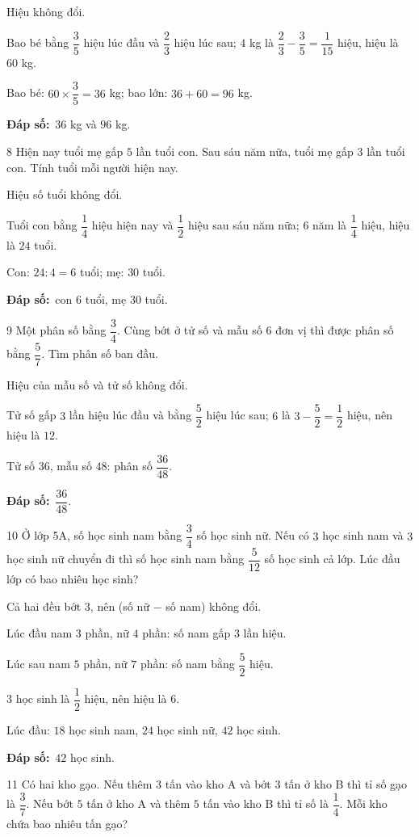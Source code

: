 \documentclass[11pt]{article}
\newif\ifsol \solfalse
\providecommand{\AnsWord}{Đáp số}
\newcommand{\dapso}[1]{\par\textbf{\AnsWord:}\ #1}
\newcommand{\probsol}[1]{%
  \begin{lrbox}{\solmeasure}\begin{minipage}{\dimexpr\linewidth-24pt\relax}#1\end{minipage}\end{lrbox}%
  \ifsol
    \begin{solbox}#1\end{solbox}%
  \else
    \setlength{\solht}{\dimexpr\ht\solmeasure+\dp\solmeasure+0.85cm\relax}%
    \ifdim\solht<1.35cm\setlength{\solht}{1.35cm}\fi
    \begin{tcolorbox}[colback=white,colframe=Line,boxrule=0.8pt,arc=5pt,
      left=8pt,right=8pt,top=4pt,bottom=4pt,height=\solht]{\footnotesize\color{Slate}\itshape\WorkWord}\end{tcolorbox}%
  \fi}
\newcommand{\gap}{\vspace{0.3cm}}
\def\WorkWord{Bài làm:}
\def\AnsWord{Đáp số}
\begin{document}
\probsol{
Hiệu không đổi.\par Bao bé bằng $\dfrac35$ hiệu lúc đầu và $\dfrac23$ hiệu lúc sau; $4$ kg là $\dfrac23-\dfrac35=\dfrac1{15}$ hiệu, hiệu là $60$ kg.\par
Bao bé: $60\times\dfrac35=36$ kg; bao lớn: $36+60=96$ kg.
\dapso{$36$ kg và $96$ kg.}}
\gap
\begin{probbox}{8}{\relax}
Hiện nay tuổi mẹ gấp $5$ lần tuổi con. Sau sáu năm nữa, tuổi mẹ gấp $3$ lần tuổi con. Tính tuổi mỗi người hiện nay.
\end{probbox}
\probsol{
Hiệu số tuổi không đổi.\par Tuổi con bằng $\dfrac14$ hiệu hiện nay và $\dfrac12$ hiệu sau sáu năm nữa; $6$ năm là $\dfrac14$ hiệu, hiệu là $24$ tuổi.\par
Con: $24:4=6$ tuổi; mẹ: $30$ tuổi.
\dapso{con $6$ tuổi, mẹ $30$ tuổi.}}
\gap
\begin{probbox}{9}{\relax}
Một phân số bằng $\dfrac34$. Cùng bớt ở tử số và mẫu số $6$ đơn vị thì được phân số bằng $\dfrac57$. Tìm phân số ban đầu.
\end{probbox}
\probsol{
Hiệu của mẫu số và tử số không đổi.\par Tử số gấp $3$ lần hiệu lúc đầu và bằng $\dfrac52$ hiệu lúc sau; $6$ là $3-\dfrac52=\dfrac12$ hiệu, nên hiệu là $12$.\par
Tử số $36$, mẫu số $48$: phân số $\dfrac{36}{48}$.
\dapso{$\dfrac{36}{48}$.}}
\gap
\begin{probbox}{10}{\relax}
Ở lớp 5A, số học sinh nam bằng $\dfrac34$ số học sinh nữ. Nếu có $3$ học sinh nam và $3$ học sinh nữ chuyển đi thì số học sinh nam bằng $\dfrac5{12}$ số học sinh cả lớp. Lúc đầu lớp có bao nhiêu học sinh?
\end{probbox}
\probsol{
Cả hai đều bớt $3$, nên (số nữ $-$ số nam) không đổi.\par Lúc đầu nam $3$ phần, nữ $4$ phần: số nam gấp $3$ lần hiệu.\par
Lúc sau nam $5$ phần, nữ $7$ phần: số nam bằng $\dfrac52$ hiệu.\par $3$ học sinh là $\dfrac12$ hiệu, nên hiệu là $6$.\par
Lúc đầu: $18$ học sinh nam, $24$ học sinh nữ, $42$ học sinh.
\dapso{$42$ học sinh.}}
\gap
\begin{probbox}{11}{\relax}
Có hai kho gạo. Nếu thêm $3$ tấn vào kho A và bớt $3$ tấn ở kho B thì tỉ số gạo là $\dfrac37$. Nếu bớt $5$ tấn ở kho A và thêm $5$ tấn vào kho B thì tỉ số là $\dfrac14$. Mỗi kho chứa bao nhiêu tấn gạo?
\end{probbox}
\end{document}

